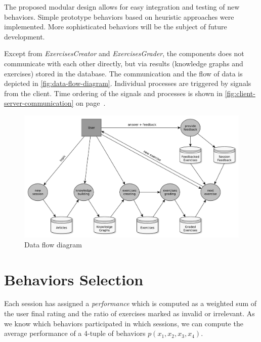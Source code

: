 \documentclass[12pt, twoside]{fithesis2}		%
\renewcommand{\_}{\leavevmode \kern0.07em\vbox{\hrule width0.4em}}
\begin{document}
The proposed modular design allows for easy integration and testing of new behaviors.
Simple prototype behaviors based on heuristic approaches were implemented.
More sophisticated behaviors will be the subject of future development.

Except from \textit{ExercisesCreator} and \textit{ExercisesGrader},
the components does not communicate with each other directly,
but via results (knowledge graphs and exercises) stored in the database.
The communication and the flow of data is depicted in \autoref{fig:data-flow-diagram}.
Individual processes are triggered by signals from the client.
Time ordering of the signals and processes is shown in \autoref{fig:client-server-communication}
on page~\pageref{fig:client-server-communication}.

\begin{figure}[h]
  \centering
  \includegraphics[width=\textwidth]{images/data-flow-diagram.pdf}
  \caption{Data flow diagram}
  \label{fig:data-flow-diagram}
\end{figure}

\section{Behaviors Selection}
\label{sec:smartoo-behaviors-selection}

Each session has assigned a \textit{performance} which is computed as a weighted sum of the user final rating and the ratio of exercises marked as invalid or irrelevant.
As we know which behaviors participated in which sessions, we can compute the average performance of a 4-tuple of behaviors $p(x_1, x_2, x_3, x_4)$.
\end{document}
